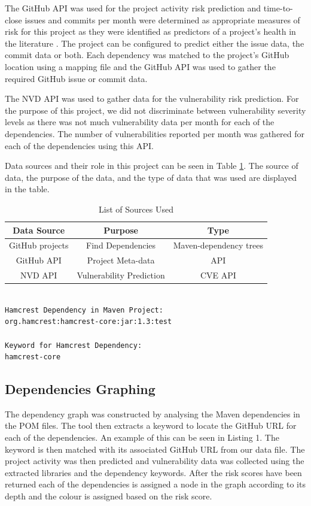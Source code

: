 \documentclass[conference]{IEEEtran}
\begin{document}
The GitHub API was used for the project activity risk prediction and time-to-close issues and commits per month were determined as appropriate measures of risk for this project as they were identified as predictors of a project's health in the literature \cite{xia_predicting_2022}. The project can be configured to predict either the issue data, the commit data or both. Each dependency was matched to the project's GitHub location using a mapping file and the GitHub API was used to gather the required GitHub issue or commit data. 

The NVD API was used to gather data for the vulnerability risk prediction. For the purpose of this project, we did not discriminate between vulnerability severity levels as there was not much vulnerability data per month for each of the dependencies. The number of vulnerabilities reported per month was gathered for each of the dependencies using this API. 

Data sources and their role in this project can be seen in Table \ref{sourcelist}. The source of data, the purpose of the data, and the type of data that was used are displayed in the table. 

\begin{table}
 \caption{List of Sources Used}
\label{sourcelist}
\begin{center}
\begin{tabular}{|c|c|c|}
\hline
    \textbf{Data Source} & \textbf{Purpose} & \textbf{Type} \\ \hline
    GitHub projects & Find Dependencies & Maven-dependency trees \\ \hline
    GitHub API & Project Meta-data & API  \\ \hline
    NVD API & Vulnerability Prediction & CVE API \\ \hline
\end{tabular}
\end{center}
\end{table}

\begin{lstlisting}[caption=Example GitHub extraction]

Hamcrest Dependency in Maven Project:
org.hamcrest:hamcrest-core:jar:1.3:test

Keyword for Hamcrest Dependency:
hamcrest-core

\end{lstlisting}

\subsection{Dependencies Graphing}
The dependency graph was constructed by analysing the Maven dependencies in the POM files. The tool then extracts a keyword to locate the GitHub URL for each of the dependencies. An example of this can be seen in Listing 1. The keyword is then matched with its associated GitHub URL from our data file. The project activity was then predicted and vulnerability data was collected using the extracted libraries and the dependency keywords. After the risk scores have been returned each of the dependencies is assigned a node in the graph according to its depth and the colour is assigned based on the risk score.
\end{document}

